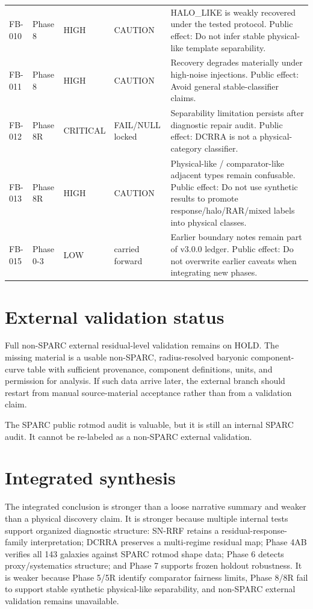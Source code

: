 \documentclass[11pt]{article}
\begin{document}
{\begin{longtable}{p{}p{}p{}p{}p{}}
FB-010 & Phase 8 & HIGH & CAUTION & HALO\_LIKE is weakly recovered under the tested protocol. Public effect: Do not infer stable physical-like template separability. \\
FB-011 & Phase 8 & HIGH & CAUTION & Recovery degrades materially under high-noise injections. Public effect: Avoid general stable-classifier claims. \\
FB-012 & Phase 8R & CRITICAL & FAIL/NULL locked & Separability limitation persists after diagnostic repair audit. Public effect: DCRRA is not a physical-category classifier. \\
FB-013 & Phase 8R & HIGH & CAUTION & Physical-like / comparator-like adjacent types remain confusable. Public effect: Do not use synthetic results to promote response/halo/RAR/mixed labels into physical classes. \\
FB-015 & Phase 0-3 & LOW & carried forward & Earlier boundary notes remain part of v3.0.0 ledger. Public effect: Do not overwrite earlier caveats when integrating new phases. \\
\bottomrule
\end{longtable}
}

\section{External validation status}
Full non-SPARC external residual-level validation remains on HOLD. The missing material is a usable non-SPARC, radius-resolved baryonic component-curve table with sufficient provenance, component definitions, units, and permission for analysis. If such data arrive later, the external branch should restart from manual source-material acceptance rather than from a validation claim.

The SPARC public rotmod audit is valuable, but it is still an internal SPARC audit. It cannot be re-labeled as a non-SPARC external validation.

\section{Integrated synthesis}
The integrated conclusion is stronger than a loose narrative summary and weaker than a physical discovery claim. It is stronger because multiple internal tests support organized diagnostic structure: SN-RRF retains a residual-response-family interpretation; DCRRA preserves a multi-regime residual map; Phase 4AB verifies all 143 galaxies against SPARC rotmod shape data; Phase 6 detects proxy/systematics structure; and Phase 7 supports frozen holdout robustness. It is weaker because Phase 5/5R identify comparator fairness limits, Phase 8/8R fail to support stable synthetic physical-like separability, and non-SPARC external validation remains unavailable.
\end{document}
